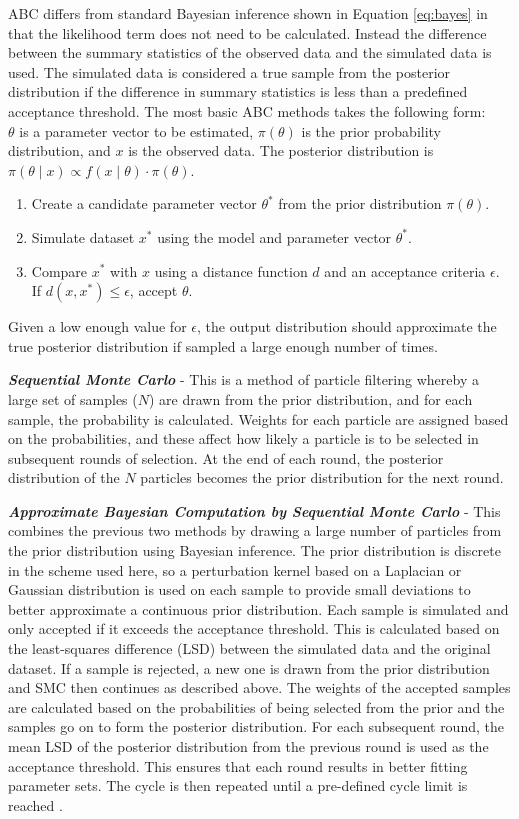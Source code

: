 ABC differs from standard Bayesian inference shown in Equation \ref{eq:bayes} in that the likelihood term does not need to be calculated. Instead the difference between the summary statistics of the observed data and the simulated data is used. The simulated data is considered a true sample from the posterior distribution if the difference in summary statistics is less than a predefined acceptance threshold.
The most basic ABC methods takes the following form:\\
$\theta$ is a parameter vector to be estimated, $\pi(\theta)$ is the prior probability distribution, and $x$ is the observed data. The posterior distribution is $\pi(\theta \mid x) \propto f(x \mid \theta)\cdot \pi(\theta)$.
\begin{enumerate}
	\item Create a candidate parameter vector $\theta^*$ from the prior distribution $\pi(\theta)$.
	\item Simulate dataset $x^*$ using the model and parameter vector $\theta^*$.
	\item Compare $x^*$ with $x$ using a distance function $d$ and an acceptance criteria $\epsilon$. If $d(x,x^*)\leq \epsilon$, accept $\theta$.
\end{enumerate}

Given a low enough value for $\epsilon$, the output distribution should approximate the true posterior distribution if sampled a large enough number of times.

\textbf{\textit{Sequential Monte Carlo}} - This is a method of particle filtering whereby a large set of samples ($N$) are drawn from the prior distribution, and for each sample, the probability is calculated. Weights for each particle are assigned based on the probabilities, and these affect how likely a particle is to be selected in subsequent rounds of selection. At the end of each round, the posterior distribution of the $N$ particles becomes the prior distribution for the next round.

\textbf{\textit{Approximate Bayesian Computation by Sequential Monte Carlo}} - This combines the previous two methods by drawing a large number of particles from the prior distribution using Bayesian inference. The prior distribution is discrete in the scheme used here, so a perturbation kernel based on a Laplacian or Gaussian distribution is used on each sample to provide small deviations to better approximate a continuous prior distribution. Each sample is simulated and only accepted if it exceeds the acceptance threshold. This is calculated based on the least-squares difference (LSD) between the simulated data and the original dataset. If a sample is rejected, a new one is drawn from the prior distribution and SMC then continues as described above. The weights of the accepted samples are calculated based on the probabilities of being selected from the prior and the samples go on to form the posterior distribution. For each subsequent round, the mean LSD of the posterior distribution from the previous round is used as the acceptance threshold. This ensures that each round results in better fitting parameter sets. The cycle is then repeated until a pre-defined cycle limit is reached \cite{Toni2009}.


